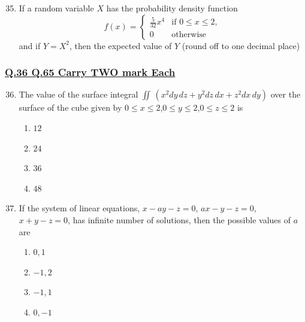 \documentclass[journal]{IEEEtran}
\theoremstyle{remark}
\begin{document}
\begin{enumerate}[itemsep=1em]
\setcounter{enumi}{34}
\item If a random variable $X$ has the probability density function 
\[
f(x) =
\begin{cases}
\frac{5}{32}x^4 & \text{if } 0 \le x \le 2, \\
0 & \text{otherwise } 
\end{cases}
\]
and if $Y=X^2$, then the expected value of $Y$ \underline{\hspace{2cm}} (round off to one decimal place) 
\end{enumerate}

\subsubsection{\underline{Q.36 \text{-} Q.65 Carry TWO mark Each}}
\begin{enumerate}[itemsep=1em]
\setcounter{enumi}{35}
\item The value of the surface integral $\iint\,(x^2dy\,dz +y^2 dz\,dx+z^2dx\,dy)$  over the surface of the cube given by $0 \le x \le 2$,$0 \le y \le 2$,$0 \le z \le 2$ is
\begin{multicols}{4}
\begin{enumerate}
    \item $12$
    \item $24$
    \item $36$
    \item $48$
\end{enumerate}
\end{multicols}
\end{enumerate}

\newpage
\vspace*{0.25cm}

\begin{enumerate}[itemsep=1em]
\setcounter{enumi}{36}
\item If the system of linear equations, $x-ay-z=0$, $ax-y-z=0$, $x+y-z=0$, has infinite number of solutions, then the possible values of $a$ are 
\begin{multicols}{4}
\begin{enumerate}
     \item $0,1$
     \item $-1,2$
     \item $-1,1$
     \item $0,-1$
\end{enumerate}
\end{multicols}
\end{enumerate}
\end{document}
